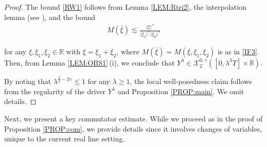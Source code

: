 \documentclass[letterpaper, 11pt,  reqno]{amsart}
\newcommand{\1}{\hspace{0.5mm}\text{I}\hspace{0.5mm}}
\newcommand{\noi}{\noindent}
\newcommand{\R}{\mathbb{R}}
\newcommand{\g}{\gamma}
\newcommand{\ld}{\lambda}
\newcommand{\les}{\lesssim}
\newcommand{\jb}[1]
{\langle #1 \rangle}
\newcommand{\cX}{\mathcal{X}}
\numberwithin{equation}{section}
\numberwithin{theorem}{section}
\begin{document}
\begin{proof}

The bound \eqref{RW1}
follows from Lemma \ref{LEM:Rtri2}, 
 the interpolation lemma (see \cite[Lemma~12.1]{CKSTT04}),
 and 
the bound
\begin{align*}
 M (\bar \xi) \les  \frac{\jb{\xi}^{s}}{\jb{\xi_1}^{s}\jb{\xi_2}^{s}}
\end{align*}

\noi
for any
$\xi, \xi_1, \xi_2 \in \R$
with $\xi = \xi_1 + \xi_2$, 
where $ M (\bar \xi) =  M (\xi, \xi_1, \xi_2)$
is as in \eqref{IF3}.
 Then, from 
 Lemma  \ref{LEM:OBS1}\,(i), 
 we conclude that 
$Y^\ld \in  \cX^{0, \g}_2([0, \ld^3T] \times \R)$.


By noting that 
$ \ld^{ \frac32  -3\g} \le 1$
for any $\ld \ge 1$, 
the local well-posedness claim 
follows
from the regularity of the driver $Y^\ld$ and Proposition \ref{PROP:main}.
We omit details.
\end{proof}








Next, we present a key 
commutator estimate.
While we proceed as in the proof of 
Proposition \ref{PROP:com}, 
we provide details
since it involves changes of variables, 
unique to the current real line setting.
\end{document}
